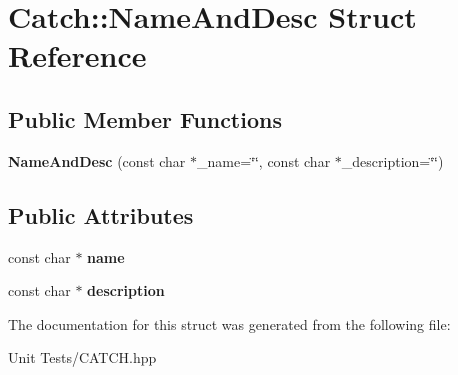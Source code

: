 \hypertarget{structCatch_1_1NameAndDesc}{}\section{Catch\+:\+:Name\+And\+Desc Struct Reference}
\label{structCatch_1_1NameAndDesc}
\subsection*{Public Member Functions}
\begin{DoxyCompactItemize}
\item 
{\bfseries Name\+And\+Desc} (const char $\ast$\+\_\+name=\char`\"{}\char`\"{}, const char $\ast$\+\_\+description=\char`\"{}\char`\"{})\hypertarget{structCatch_1_1NameAndDesc_a189ceb9942fb5f6635140d6a09fc843a}{}\label{structCatch_1_1NameAndDesc_a189ceb9942fb5f6635140d6a09fc843a}

\end{DoxyCompactItemize}
\subsection*{Public Attributes}
\begin{DoxyCompactItemize}
\item 
const char $\ast$ {\bfseries name}\hypertarget{structCatch_1_1NameAndDesc_a374b4ed8be3cf98be20ebde5273bde51}{}\label{structCatch_1_1NameAndDesc_a374b4ed8be3cf98be20ebde5273bde51}

\item 
const char $\ast$ {\bfseries description}\hypertarget{structCatch_1_1NameAndDesc_a3463a23ff65ce494fc380452b57b7970}{}\label{structCatch_1_1NameAndDesc_a3463a23ff65ce494fc380452b57b7970}

\end{DoxyCompactItemize}


The documentation for this struct was generated from the following file\+:\begin{DoxyCompactItemize}
\item 
Unit Tests/C\+A\+T\+C\+H.\+hpp\end{DoxyCompactItemize}
